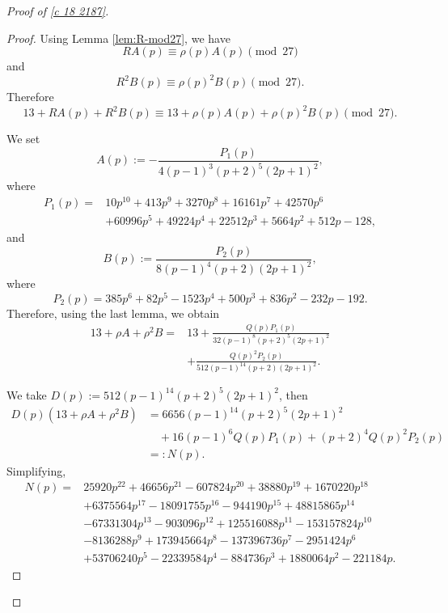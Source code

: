 \documentclass[12pt]{article}
\numberwithin{equation}{section}
\theoremstyle{plain}
\numberwithin{theorem}{section}
\theoremstyle{definition}
\theoremstyle{remark}
\begin{document}
\begin{proof}[Proof of \eqref{c 18 2187}]
\begin{proof}
Using Lemma \ref{lem:R-mod27}, we have
\begin{equation*}
RA(p)\equiv\rho(p)A(p)\pmod{27}
\end{equation*}
and
\begin{equation*}
R^2B(p)\equiv\rho(p)^2B(p)\pmod{27}.
\end{equation*}
Therefore
\begin{equation*}
13+RA(p)+R^2B(p)
\equiv
13+\rho(p)A(p)+\rho(p)^2B(p)
\pmod{27}.
\end{equation*}

We set
\begin{equation*}
A(p):=-\frac{P_1(p)}{4(p-1)^3(p+2)^5(2p+1)^2},
\end{equation*}
where
\begin{align*}
P_1(p)
={}&
10p^{10}
+413p^9
+3270p^8
+16161p^7
+42570p^6
\\
&+
60996p^5
+49224p^4
+22512p^3
+5664p^2
+512p
-128,
\end{align*}
and
\begin{equation*}
B(p):=\frac{P_2(p)}{8(p-1)^4(p+2)(2p+1)^2},
\end{equation*}
where
\begin{equation*}
P_2(p)
=
385p^6
+82p^5
-1523p^4
+500p^3
+836p^2
-232p
-192.
\end{equation*}
Therefore, using the last lemma, we obtain
\begin{align*}
13+\rho A+\rho^2B
={}&
13
+
\frac{Q(p)P_1(p)}
{32(p-1)^8(p+2)^5(2p+1)^2}
\\
&+
\frac{Q(p)^2P_2(p)}
{512(p-1)^{14}(p+2)(2p+1)^2}.
\end{align*}

We take $D(p):=512(p-1)^{14}(p+2)^5(2p+1)^2$, then
\begin{align*}
D(p)\left(13+\rho A+\rho^2B\right)
&=
6656(p-1)^{14}(p+2)^5(2p+1)^2
\\
&\quad
+
16(p-1)^6Q(p)P_1(p)
+
(p+2)^4Q(p)^2P_2(p)
\\
&=:N(p).
\end{align*}
Simplifying,
\iffalse
\begin{align*}
N(p)
={}&
25920p^{22}
+46656p^{21}
-607824p^{20}
+38880p^{19}
+1670220p^{18}
\\
&+
6375564p^{17}
-18091755p^{16}
-944190p^{15}
+48815865p^{14}
\\
&-
67331304p^{13}
-903096p^{12}
+125516088p^{11}
-153157824p^{10}
\\
&-
8136288p^9
+173945664p^8
-137396736p^7
-2951424p^6
\\
&+
53706240p^5
-22339584p^4
-884736p^3
+1880064p^2
-221184p.
\end{align*}


\end{proof}
\end{proof}
\end{document}

